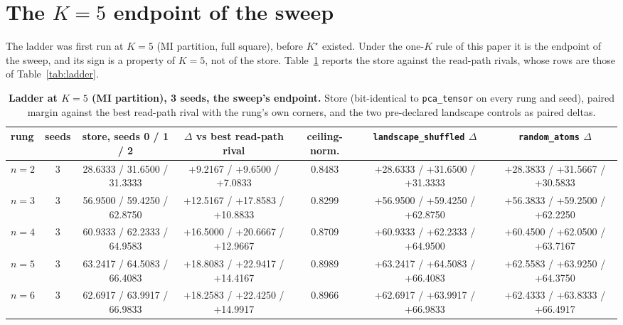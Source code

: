 \documentclass{article} %
\newcommand{\Kstar}{\ensuremath{K^{\star}}}
\begin{document}
\section{The $K=5$ endpoint of the sweep}
\label{app:k5}

The ladder was first run at $K=5$ (MI partition, full square), before $\Kstar$ existed. Under
the one-$K$ rule of this paper it is the endpoint of the sweep, and its sign is a property of $K=5$, not of
the store. Table~\ref{tab:k5} reports the store against the read-path rivals, whose rows are
those of Table~\ref{tab:ladder}.

\begin{table}[h]
\centering\small
\caption{\textbf{Ladder at $K=5$ (MI partition), 3 seeds, the sweep's endpoint.} Store
(bit-identical to \texttt{pca\_tensor} on every rung and seed), paired margin against the best
read-path rival with the rung's own corners, and the two pre-declared landscape controls as paired deltas.}
\label{tab:k5}
\setlength{\tabcolsep}{2.4pt}
\begin{adjustbox}{max width=\linewidth}\begin{tabular}{lcccccc}
\toprule
rung & seeds & store, seeds 0 / 1 / 2 & $\Delta$ vs best read-path rival & ceiling-norm. & \texttt{landscape\_shuffled} $\Delta$ & \texttt{random\_atoms} $\Delta$ \\
\midrule
$n=2$ & 3 & 28.6333 / 31.6500 / 31.3333 & +9.2167 / +9.6500 / +7.0833 & 0.8483 & +28.6333 / +31.6500 / +31.3333 & +28.3833 / +31.5667 / +30.5833 \\
$n=3$ & 3 & 56.9500 / 59.4250 / 62.8750 & +12.5167 / +17.8583 / +10.8833 & 0.8299 & +56.9500 / +59.4250 / +62.8750 & +56.3833 / +59.2500 / +62.2250 \\
$n=4$ & 3 & 60.9333 / 62.2333 / 64.9583 & +16.5000 / +20.6667 / +12.9667 & 0.8709 & +60.9333 / +62.2333 / +64.9500 & +60.4500 / +62.0500 / +63.7167 \\
$n=5$ & 3 & 63.2417 / 64.5083 / 66.4083 & +18.8083 / +22.9417 / +14.4167 & 0.8989 & +63.2417 / +64.5083 / +66.4083 & +62.5583 / +63.9250 / +64.3750 \\
$n=6$ & 3 & 62.6917 / 63.9917 / 66.9833 & +18.2583 / +22.4250 / +14.9917 & 0.8966 & +62.6917 / +63.9917 / +66.9833 & +62.4333 / +63.8333 / +66.4917 \\
\bottomrule
\end{tabular}\end{adjustbox}
\end{table}
\end{document}
